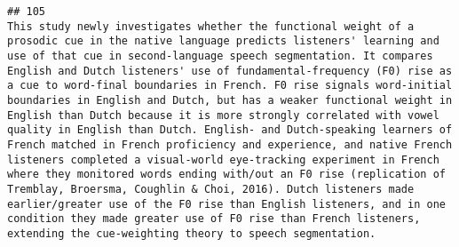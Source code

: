 \documentclass[
  english,
  man]{apa6}
\begin{document}
\begin{verbatim}
## 105                                                                                                                                                                                                                                                                                                                                                                                                                                                                                                                                                                                                                                                                                                                                                                                                                                                                                                                                                                                                                                                                                                                                                                                                                                                                                                                                                                                                                                                                                                                                                                                                         This study newly investigates whether the functional weight of a prosodic cue in the native language predicts listeners' learning and use of that cue in second-language speech segmentation. It compares English and Dutch listeners' use of fundamental-frequency (F0) rise as a cue to word-final boundaries in French. F0 rise signals word-initial boundaries in English and Dutch, but has a weaker functional weight in English than Dutch because it is more strongly correlated with vowel quality in English than Dutch. English- and Dutch-speaking learners of French matched in French proficiency and experience, and native French listeners completed a visual-world eye-tracking experiment in French where they monitored words ending with/out an F0 rise (replication of Tremblay, Broersma, Coughlin & Choi, 2016). Dutch listeners made earlier/greater use of the F0 rise than English listeners, and in one condition they made greater use of F0 rise than French listeners, extending the cue-weighting theory to speech segmentation.

\end{verbatim}
\end{document}
